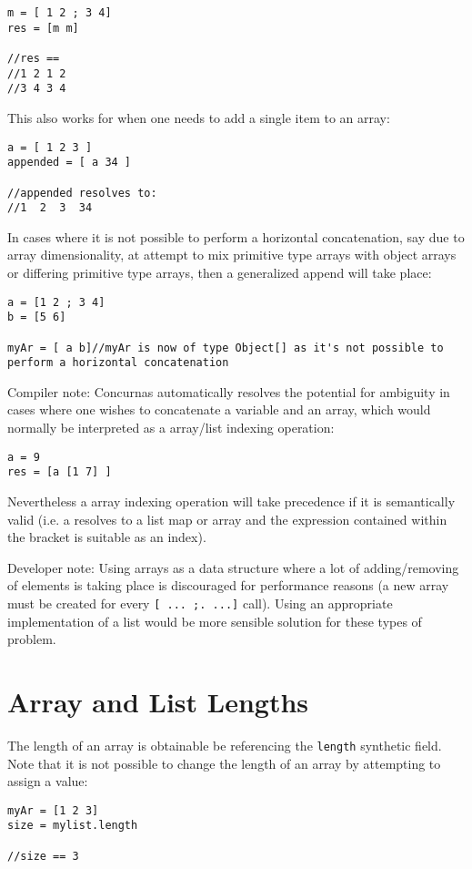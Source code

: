 \documentclass[conc-doc]{subfiles}
\begin{document}
\begin{lstlisting}
m = [ 1 2 ; 3 4]
res = [m m]

//res ==
//1 2 1 2
//3 4 3 4
\end{lstlisting}

This also works for when one needs to add a single item to an array:
\begin{lstlisting}
a = [ 1 2 3 ]
appended = [ a 34 ]

//appended resolves to:
//1  2  3  34
\end{lstlisting}

In cases where it is not possible to perform a horizontal concatenation, say due to array dimensionality, at attempt to mix primitive type arrays with object arrays or differing primitive type arrays, then a generalized append will take place:
\begin{lstlisting}
a = [1 2 ; 3 4]
b = [5 6]

myAr = [ a b]//myAr is now of type Object[] as it's not possible to perform a horizontal concatenation
\end{lstlisting}

Compiler note: Concurnas automatically resolves the potential for ambiguity in cases where one wishes to concatenate a variable and an array, which would normally be interpreted as a array/list indexing operation:
\begin{lstlisting}
a = 9
res = [a [1 7] ]
\end{lstlisting}
Nevertheless a array indexing operation will take precedence if it is semantically valid (i.e. a resolves to a list map or array and the expression contained within the bracket is suitable as an index).

Developer note: Using arrays as a data structure where a lot of adding/removing of elements is taking place is discouraged for performance reasons (a new array must be created for every \lstinline{[ ... ;. ...]} call). Using an appropriate implementation of a list would be more sensible solution for these types of problem.

\section{Array and List Lengths}
The length of an array is obtainable be referencing the \lstinline{length} synthetic field. Note that it is not possible to change the length of an array by attempting to assign a value:
\begin{lstlisting}
myAr = [1 2 3]
size = mylist.length

//size == 3
\end{lstlisting}
\end{document}
